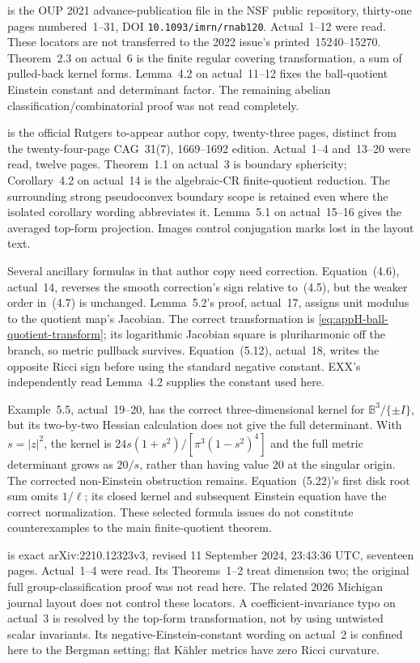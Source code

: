 \cite{EbenfeltXiaoXu21BallQuotientsAdvance} is the OUP 2021
advance-publication file in the NSF public repository, thirty-one
pages numbered~1--31, DOI \nolinkurl{10.1093/imrn/rnab120}.
Actual~1--12 were read. These locators are not transferred to
the 2022 issue's printed~15240--15270. Theorem~2.3 on actual~6
is the finite regular covering transformation, a sum of pulled-back
kernel forms. Lemma~4.2 on actual~11--12 fixes the ball-quotient
Einstein constant and determinant factor. The remaining abelian
classification/combinatorial proof was not read completely.

\cite{HuangLiBergmanSteinAuthorCopy} is the official Rutgers
to-appear author copy, twenty-three pages, distinct from the
twenty-four-page CAG~31(7), 1669--1692 edition. Actual~1--4
and~13--20 were read, twelve pages. Theorem~1.1 on actual~3
is boundary sphericity; Corollary~4.2 on actual~14 is the
algebraic-CR finite-quotient reduction. The surrounding strong
pseudoconvex boundary scope is retained even where the isolated
corollary wording abbreviates it. Lemma~5.1 on actual~15--16
gives the averaged top-form projection. Images control conjugation
marks lost in the layout text.

Several ancillary formulas in that author copy need correction.
Equation~(4.6), actual~14, reverses the smooth correction's sign
relative to~(4.5), but the weaker order in~(4.7) is unchanged.
Lemma~5.2's proof, actual~17, assigns unit modulus to the
quotient map's Jacobian. The correct transformation is
\eqref{eq:appH-ball-quotient-transform}; its logarithmic
Jacobian square is pluriharmonic off the branch, so metric
pullback survives. Equation~(5.12), actual~18, writes the
opposite Ricci sign before using the standard negative constant.
EXX's independently read Lemma~4.2 supplies the constant used here.

Example~5.5, actual~19--20, has the correct three-dimensional
kernel for $\mathbb B^3/\{\pm I\}$, but its two-by-two Hessian
calculation does not give the full determinant. With $s=|z|^2$,
the kernel is $24s(1+s^2)/[\pi^3(1-s^2)^4]$ and the full
metric determinant grows as $20/s$, rather than having value
$20$ at the singular origin. The corrected non-Einstein
obstruction remains. Equation~(5.22)'s first disk root sum
omits $1/\ell$; its closed kernel and subsequent Einstein
equation have the correct normalization. These selected
formula issues do not constitute counterexamples to the main
finite-quotient theorem.

\cite{GangulySinha24SteinV3} is exact arXiv:2210.12323v3,
revised 11 September 2024, 23:43:36 UTC, seventeen pages.
Actual~1--4 were read. Its Theorems~1--2 treat dimension two;
the original full group-classification proof was not read here.
The related 2026 Michigan journal layout does not control these
locators. A coefficient-invariance typo on actual~3 is resolved
by the top-form transformation, not by using untwisted scalar
invariants. Its negative-Einstein-constant wording on actual~2
is confined here to the Bergman setting; flat K\"ahler metrics
have zero Ricci curvature.

